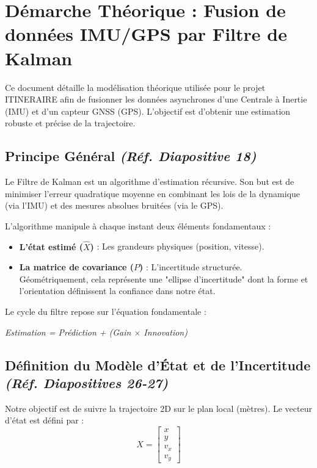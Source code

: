 \section{Démarche Théorique : Fusion de données IMU/GPS par Filtre de Kalman}

Ce document détaille la modélisation théorique utilisée pour le projet ITINERAIRE afin de fusionner les données asynchrones d'une Centrale à Inertie (IMU) et d'un capteur GNSS (GPS). L'objectif est d'obtenir une estimation robuste et précise de la trajectoire.

\subsection{Principe Général \textit{(Réf. Diapositive 18)}}
Le Filtre de Kalman est un algorithme d'estimation récursive. Son but est de minimiser l'erreur quadratique moyenne en combinant les lois de la dynamique (via l'IMU) et des mesures absolues bruitées (via le GPS). 

L'algorithme manipule à chaque instant deux éléments fondamentaux :
\begin{itemize}
    \item \textbf{L'état estimé ($\hat{X}$)} : Les grandeurs physiques (position, vitesse).
    \item \textbf{La matrice de covariance ($P$)} : L'incertitude structurée. Géométriquement, cela représente une "ellipse d'incertitude" dont la forme et l'orientation définissent la confiance dans notre état.
\end{itemize}

Le cycle du filtre repose sur l'équation fondamentale :
\begin{center}
    \textit{Estimation = Prédiction + (Gain $\times$ Innovation)}
\end{center}

\subsection{Définition du Modèle d'État et de l'Incertitude \textit{(Réf. Diapositives 26-27)}}
Notre objectif est de suivre la trajectoire 2D sur le plan local (mètres). Le vecteur d'état est défini par :
\begin{equation}
X = \begin{bmatrix} x \\ y \\ v_x \\ v_y \end{bmatrix}
\end{equation}


